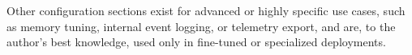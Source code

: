 Other configuration sections exist for advanced or highly specific use cases, such as memory tuning, internal event logging, or telemetry export, 
and are, to the author's best knowledge, used only in fine-tuned or specialized deployments.















